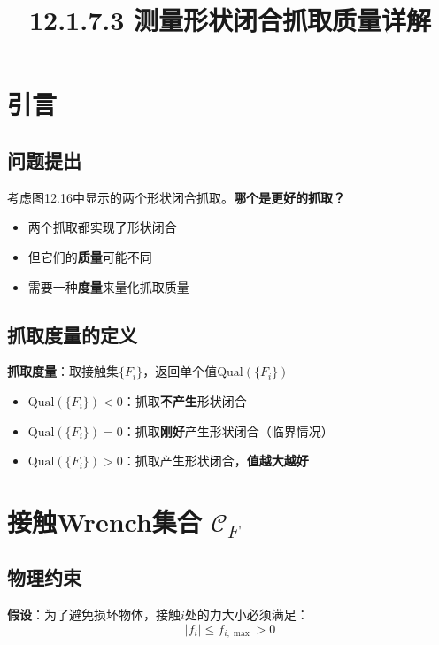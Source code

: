 \documentclass[12pt,a4paper]{article}
\title{12.1.7.3 测量形状闭合抓取质量详解}
\author{}
\date{}
\begin{document}
\maketitle

\section{引言}

\subsection{问题提出}

考虑图12.16中显示的两个形状闭合抓取。\textbf{哪个是更好的抓取？}

\begin{itemize}
\item 两个抓取都实现了形状闭合
\item 但它们的\textbf{质量}可能不同
\item 需要一种\textbf{度量}来量化抓取质量
\end{itemize}

\subsection{抓取度量的定义}

\textbf{抓取度量}：取接触集$\{F_i\}$，返回单个值$\text{Qual}(\{F_i\})$

\begin{itemize}
\item $\text{Qual}(\{F_i\}) < 0$：抓取\textbf{不产生}形状闭合
\item $\text{Qual}(\{F_i\}) = 0$：抓取\textbf{刚好}产生形状闭合（临界情况）
\item $\text{Qual}(\{F_i\}) > 0$：抓取产生形状闭合，\textbf{值越大越好}
\end{itemize}

\section{接触Wrench集合 $\mathcal{C}_F$}

\subsection{物理约束}

\textbf{假设}：为了避免损坏物体，接触$i$处的力大小必须满足：
\begin{equation}
|f_i| \leq f_{i,\max} > 0
\label{eq:force_limit}
\end{equation}
\end{document}

